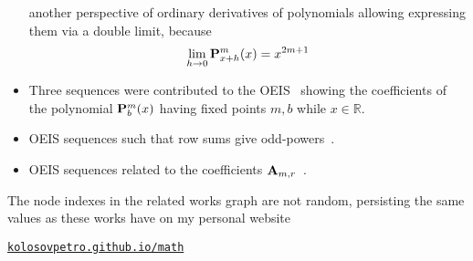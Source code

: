 \begin{itemize}
    another perspective of ordinary derivatives of polynomials allowing expressing
    them via a double limit, because
    \begin{align*}
        \lim_{h \to 0} {\mathbf{P}}\sp{m} \sb{x+h}(x) = x^{2m+1}
    \end{align*}
    \item Three sequences were contributed to the
    OEIS~\cite{oeis_coefficients_u_m_l_k_defined_by_polynomial_identity_1, oeis_coefficients_u_m_l_k_defined_by_polynomial_identity_2, oeis_coefficients_u_m_l_k_defined_by_polynomial_identity_3}
    showing the coefficients of the polynomial ${\mathbf{P}}\sp{m} \sb{b}(x)$ having fixed points $m,b$ while $x\in\mathbb{R}$.
    \item OEIS sequences such that row sums give odd-powers~\cite{oeis_numerical_triangle_row_sums_give_cubes, oeis_numerical_triangle_row_sums_give_fifth_powers, oeis_numerical_triangle_row_sums_give_seventh_powers}.
    \item OEIS sequences related to the coefficients ${\mathbf{A}} \sb{m,r}$~\cite{oeis_numerators_of_the_coefficient_a_m_r, oeis_denominators_of_the_coefficient_a_m_r}.
\end{itemize}
The node indexes in the related works graph are not random, persisting the same values as
these works have on my personal website
\begin{center}
    \href{https://kolosovpetro.github.io/math/}{\texttt{kolosovpetro.github.io/math}}
\end{center}
